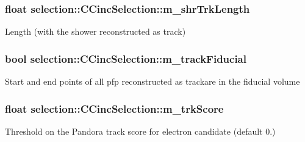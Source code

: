 \subsubsection[{\texorpdfstring{m\+\_\+shr\+Trk\+Length}{m_shrTrkLength}}]{\setlength{\rightskip}{0pt plus 5cm}float selection\+::\+C\+Cinc\+Selection\+::m\+\_\+shr\+Trk\+Length\hspace{0.3cm}{\ttfamily [private]}}\hypertarget{classselection_1_1CCincSelection_a09db29c4170084b4c366defeb3330de8}{}\label{classselection_1_1CCincSelection_a09db29c4170084b4c366defeb3330de8}
Length (with the shower reconstructed as track) 
\subsubsection[{\texorpdfstring{m\+\_\+track\+Fiducial}{m_trackFiducial}}]{\setlength{\rightskip}{0pt plus 5cm}bool selection\+::\+C\+Cinc\+Selection\+::m\+\_\+track\+Fiducial\hspace{0.3cm}{\ttfamily [private]}}\hypertarget{classselection_1_1CCincSelection_a7f2d544a3260377cab6db80b8bf81302}{}\label{classselection_1_1CCincSelection_a7f2d544a3260377cab6db80b8bf81302}
Start and end points of all pfp reconstructed as trackare in the fiducial volume 
\subsubsection[{\texorpdfstring{m\+\_\+trk\+Score}{m_trkScore}}]{\setlength{\rightskip}{0pt plus 5cm}float selection\+::\+C\+Cinc\+Selection\+::m\+\_\+trk\+Score\hspace{0.3cm}{\ttfamily [private]}}\hypertarget{classselection_1_1CCincSelection_a2c3b80516e3731ec9b4f5ccbee6864ba}{}\label{classselection_1_1CCincSelection_a2c3b80516e3731ec9b4f5ccbee6864ba}
Threshold on the Pandora track score for electron candidate (default 0.) 
